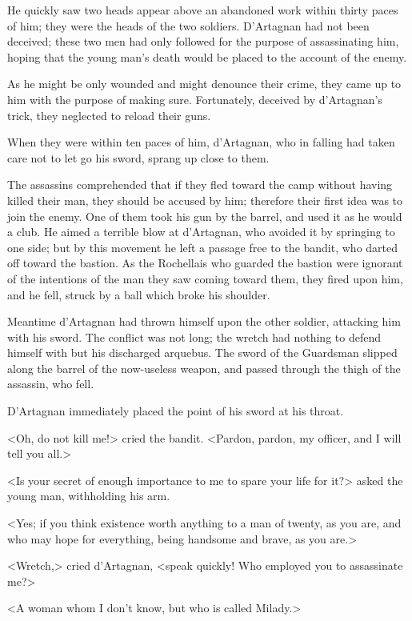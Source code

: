 He quickly saw two heads appear above an abandoned work within thirty paces of him; they were the heads of the two soldiers. D'Artagnan had not been deceived; these two men had only followed for the purpose of assassinating him, hoping that the young man's death would be placed to the account of the enemy. 

As he might be only wounded and might denounce their crime, they came up to him with the purpose of making sure. Fortunately, deceived by d'Artagnan's trick, they neglected to reload their guns. 

When they were within ten paces of him, d'Artagnan, who in falling had taken care not to let go his sword, sprang up close to them. 

The assassins comprehended that if they fled toward the camp without having killed their man, they should be accused by him; therefore their first idea was to join the enemy. One of them took his gun by the barrel, and used it as he would a club. He aimed a terrible blow at d'Artagnan, who avoided it by springing to one side; but by this movement he left a passage free to the bandit, who darted off toward the bastion. As the Rochellais who guarded the bastion were ignorant of the intentions of the man they saw coming toward them, they fired upon him, and he fell, struck by a ball which broke his shoulder. 

Meantime d'Artagnan had thrown himself upon the other soldier, attacking him with his sword. The conflict was not long; the wretch had nothing to defend himself with but his discharged arquebus. The sword of the Guardsman slipped along the barrel of the now-useless weapon, and passed through the thigh of the assassin, who fell. 

D'Artagnan immediately placed the point of his sword at his throat. 

<Oh, do not kill me!> cried the bandit. <Pardon, pardon, my officer, and I will tell you all.> 

<Is your secret of enough importance to me to spare your life for it?> asked the young man, withholding his arm. 

<Yes; if you think existence worth anything to a man of twenty, as you are, and who may hope for everything, being handsome and brave, as you are.> 

<Wretch,> cried d'Artagnan, <speak quickly! Who employed you to assassinate me?> 

<A woman whom I don't know, but who is called Milady.> 

